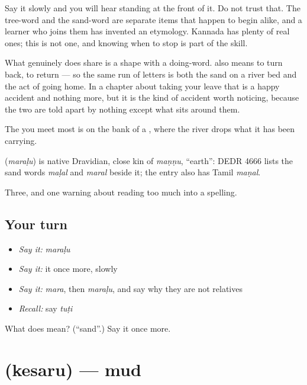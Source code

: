 Say it slowly and you will hear  standing at the front of it. Do not trust that. The tree-word and the sand-word are separate items that happen to begin alike, and a learner who joins them has invented an etymology. Kannada has plenty of real ones; this is not one, and knowing when to stop is part of the skill.

What  genuinely does share is a shape with a doing-word.  also means to turn back, to return — so the same run of letters is both the sand on a river bed and the act of going home. In a chapter about taking your leave that is a happy accident and nothing more, but it is the kind of accident worth noticing, because the two are told apart by nothing except what sits around them.

The  you meet most is on the bank of a , where the river drops what it has been carrying.

\begin{cousinweb}
\textbf{} (\emph{maraḷu}) is native Dravidian, close kin of \emph{maṇṇu}, \textquotedblleft{}earth\textquotedblright{}: DEDR 4666 lists the sand words \emph{maḷal} and \emph{maral} beside it; the entry also has Tamil \emph{maṇal}.
\end{cousinweb}

\begin{grammarlens}[title={What you've built}]
Three, and one warning about reading too much into a spelling.
\end{grammarlens}

\subsection*{Your turn}
\begin{itemize}
\raggedright
  \item \emph{Say it:} \emph{maraḷu}
  \item \emph{Say it:} it once more, slowly
  \item \emph{Say it:} \emph{mara}, then \emph{maraḷu}, and say why they are not relatives
  \item \emph{Recall:} say \emph{tuṭi}
\end{itemize}

\begin{tcolorbox}[breakable,colback=teal!4,colframe=teal!35!black,title={Before you move on}]
What does  mean? (\textquotedblleft{}sand\textquotedblright{}.) Say it once more.
\end{tcolorbox}
\section[\texorpdfstring{\kn{ಕೆಸರು} (kesaru)}{ಕೆಸರು (kesaru)}]{ (kesaru) — mud}

